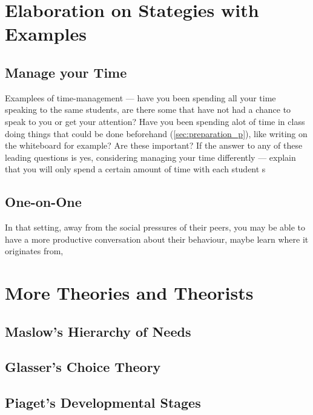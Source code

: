 \documentclass[12pt]{report}
\begin{document}
\begin{appendices}

\chapter{Elaboration on Stategies with Examples}

\section{Manage your Time}
Examplees of time-management --- have you been spending all your time speaking to the same students, are there some that have not had a chance to speak to you or get your attention? Have you been spending alot of time in class doing things that could be done beforehand (\ref{sec:preparation_p}), like writing on the whiteboard for example? Are these important? If the answer to any of these leading questions is yes, considering managing your time differently --- explain that you will only spend a certain amount of time with each student s

\section{One-on-One}

In that setting, away from the social pressures of their peers, you may be able to have a more productive conversation about their behaviour, maybe learn where it originates from,




\chapter{More Theories and Theorists}


\section{Maslow's Hierarchy of Needs}


\section{Glasser's Choice Theory}


\section{Piaget's Developmental Stages}




\end{appendices}
\end{document}
